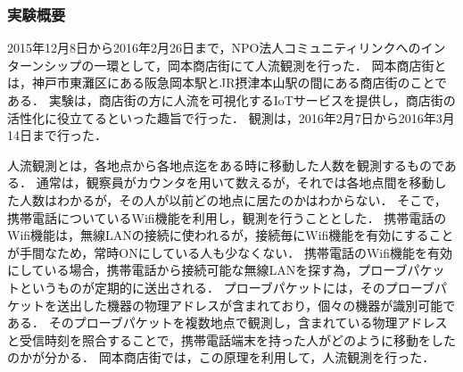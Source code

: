 \subsubsection{実験概要}
2015年12月8日から2016年2月26日まで，NPO法人コミュニティリンクへのインターンシップの一環として，岡本商店街にて人流観測を行った．
岡本商店街とは，神戸市東灘区にある阪急岡本駅とJR摂津本山駅の間にある商店街のことである．
実験は，商店街の方に人流を可視化するIoTサービスを提供し，商店街の活性化に役立てるといった趣旨で行った．
観測は，2016年2月7日から2016年3月14日まで行った．

人流観測とは，各地点から各地点迄をある時に移動した人数を観測するものである．
通常は，観察員がカウンタを用いて数えるが，それでは各地点間を移動した人数はわかるが，その人が以前どの地点に居たのかはわからない．
そこで，携帯電話についているWifi機能を利用し，観測を行うこととした．
携帯電話のWifi機能は，無線LANの接続に使われるが，接続毎にWifi機能を有効にすることが手間なため，常時ONにしている人も少なくない．
携帯電話のWifi機能を有効にしている場合，携帯電話から接続可能な無線LANを探す為，プローブパケットというものが定期的に送出される．
プローブパケットには，そのプローブパケットを送出した機器の物理アドレスが含まれており，個々の機器が識別可能である．
そのプローブパケットを複数地点で観測し，含まれている物理アドレスと受信時刻を照合することで，携帯電話端末を持った人がどのように移動をしたのかが分かる．
岡本商店街では，この原理を利用して，人流観測を行った．

